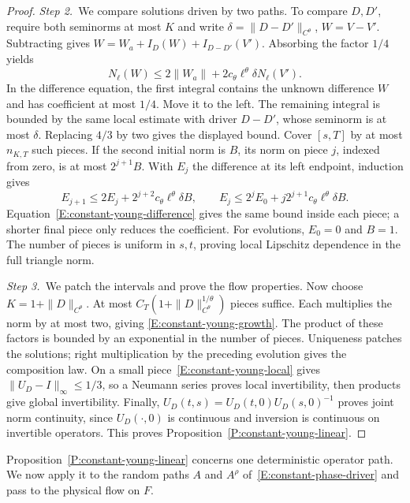 \begin{proof}
  \medskip
  \noindent\textit{Step 2.~}We compare solutions driven by two paths.
  To compare $D,D'$, require both seminorms at most $K$ and write $\delta =
  \|D-D'\|_{C^\theta}$, $W = V-V'$. Subtracting gives $W =
  W_a+I_D(W)+I_{D-D'}(V')$. Absorbing the factor $1/4$ yields
  \begin{equation}\label{E:constant-young-difference}
    N_\ell(W)\le2\|W_a\|
    +2c_\theta\ell^\theta\delta N_\ell(V').
  \end{equation}
  In the difference equation, the first integral contains the unknown
  difference $W$ and has coefficient at most $1/4$. Move it to the left. The
  remaining integral is bounded by the same local estimate with driver $D-D'$,
  whose seminorm is at most $\delta$. Replacing $4/3$ by two gives the
  displayed bound.
  Cover $[s,T]$ by at most $n_{K,T}$ such pieces. If the second initial norm is
  $B$, its norm on piece $j$, indexed from zero, is at most $2^{j+1}B$. With
  $E_j$ the difference at its left endpoint, induction gives
  \[
    E_{j+1}\le2E_j+2^{j+2}c_\theta\ell^\theta\delta B,\qquad
    E_j\le2^jE_0+j2^{j+1}c_\theta\ell^\theta\delta B.
  \]
  Equation~\eqref{E:constant-young-difference} gives the same bound inside each
  piece; a shorter final piece only reduces the coefficient. For evolutions,
  $E_0 = 0$ and $B = 1$. The number of pieces is uniform in $s,t$, proving local
  Lipschitz dependence in the full triangle norm.

  \medskip
  \noindent\textit{Step 3.~}We patch the intervals and prove the flow
  properties.
  Now choose $K = 1+\|D\|_{C^\theta}$. At most
  $C_T(1+\|D\|_{C^\theta}^{1/\theta})$ pieces suffice. Each multiplies the norm
  by at most two, giving \eqref{E:constant-young-growth}. The product of these
  factors is bounded by an exponential in the number of pieces.   Uniqueness
  patches the
  solutions; right multiplication by the preceding evolution gives the
  composition law. On a small piece~\eqref{E:constant-young-local} gives
  $\|U_D-I\|_\infty \le 1/3$, so a Neumann series proves local invertibility,
  then products give global invertibility. Finally, $U_D(t,s) =
  U_D(t,0)U_D(s,0)^{-1}$ proves joint norm continuity, since $U_D(\cdot,0)$ is
  continuous and inversion is continuous on invertible operators. This proves
  Proposition~\ref{P:constant-young-linear}.
\end{proof}

Proposition~\ref{P:constant-young-linear} concerns one deterministic operator
path. We now apply it to the random paths $A$ and $A^\rho$
of~\eqref{E:constant-phase-driver} and pass to the physical flow on $F$.

